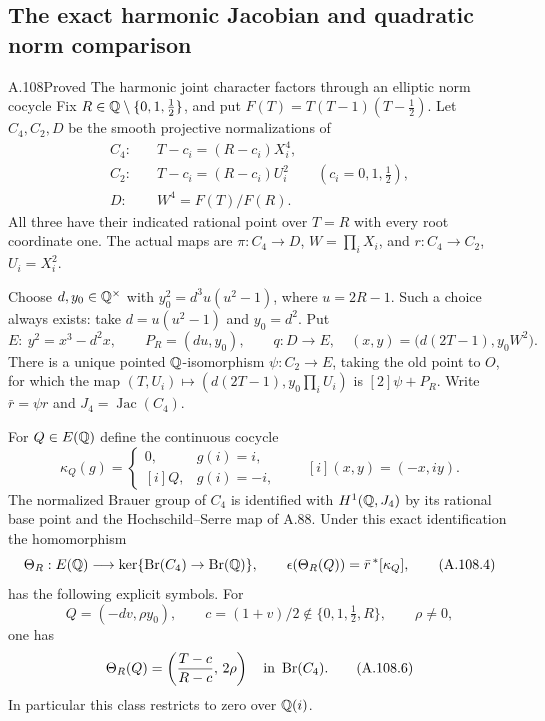 \subsection{The exact harmonic Jacobian and quadratic norm comparison}

\begin{statement}{A.108}{Proved}
{The harmonic joint character factors through an elliptic norm cocycle}
Fix $R\in\mathbb Q\setminus\{0,1,\tfrac12\}$, and put
$F(T)=T(T-1)(T-\tfrac12)$.
Let $C_4,C_2,D$ be the smooth projective normalizations of
\[
\begin{split}
 C_4:\quad&T-c_i=(R-c_i)X_i^4,\\
 C_2:\quad&T-c_i=(R-c_i)U_i^2
                 \qquad(c_i=0,1,\tfrac12),\\
 D:\quad&W^4=F(T)/F(R).
\end{split}
\tag{A.108.1}
\]
All three have their indicated rational point over $T=R$
with every root coordinate one.
The actual maps are
$\pi:C_4\to D$, $W=\prod_iX_i$, and
$r:C_4\to C_2$, $U_i=X_i^2$.

Choose $d,y_0\in\mathbb Q^\times$ with
$y_0^2=d^3u(u^2-1)$, where $u=2R-1$.
Such a choice always exists: take
$d=u(u^2-1)$ and $y_0=d^2$.
Put
\[
 E:\ y^2=x^3-d^2x,\qquad P_R=(du,y_0),\qquad
 q:D\longrightarrow E,\quad
       (x,y)=\bigl(d(2T-1),y_0W^2\bigr).
\tag{A.108.2}
\]
There is a unique pointed $\mathbb Q$-isomorphism
$\psi:C_2\to E$, taking the old point to $O$, for which
the map
$(T,U_i)\mapsto(d(2T-1),y_0\prod_iU_i)$ is
$[2]\psi+P_R$.
Write $\bar r=\psi r$ and $J_4=\operatorname{Jac}(C_4)$.

For $Q\in E(\mathbb Q)$ define the continuous cocycle
\[
 \kappa_Q(g)=
 \begin{cases}
 0,&g(i)=i,\\
 [i]Q,&g(i)=-i,
 \end{cases}
 \qquad [i](x,y)=(-x,iy).
\tag{A.108.3}
\]
The normalized Brauer group of $C_4$ is identified with
$H^1(\mathbb Q,J_4)$ by its rational base point and the
Hochschild--Serre map of A.88.
Under this exact identification the homomorphism
\[
 \Theta_R:E(\mathbb Q)\longrightarrow
       \ker\{\operatorname{Br}(C_4)\to\operatorname{Br}(\mathbb Q)\},
 \qquad
 \epsilon(\Theta_R(Q))=\bar r^{\,*}[\kappa_Q],
\tag{A.108.4}
\]
has the following explicit symbols.
For
\[
 Q=(-dv,\rho y_0),\qquad
 c=(1+v)/2\notin\{0,1,\tfrac12,R\},
                     \qquad \rho\ne0,
\tag{A.108.5}
\]
one has
\[
 \Theta_R(Q)=
        \left(\frac{T-c}{R-c},\,2\rho\right)
                            \quad\hbox{in }\operatorname{Br}(C_4).
\tag{A.108.6}
\]
In particular this class restricts to zero over $\mathbb Q(i)$.


\end{statement}
